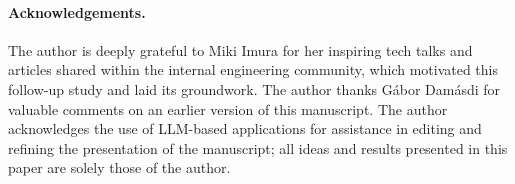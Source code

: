 \documentclass[11pt]{article}
\theoremstyle{remark}
\theoremstyle{definition}
\begin{document}
\paragraph{Acknowledgements.}
The author is deeply grateful to Miki Imura for her inspiring tech talks and
articles shared within the internal engineering community, which motivated this
follow-up study and laid its groundwork. The author thanks Gábor Damásdi for
valuable comments on an earlier version of this manuscript. The author acknowledges the use of
LLM-based applications for assistance in editing and refining the presentation
of the manuscript; all ideas and results presented in this paper are solely
those of the author.



\end{document}
